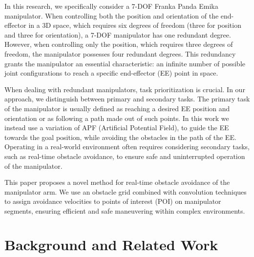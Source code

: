 \documentclass[a4paper]{article}
\begin{document}
In this research, we specifically consider a 7-DOF Franka Panda Emika~\cite{Franka2021} manipulator. When controlling both the position and orientation of the end-effector in a 3D space, which requires six degrees of freedom (three for position and three for orientation), a 7-DOF manipulator has one redundant degree. However, when controlling only the position, which requires three degrees of freedom, the manipulator possesses four redundant degrees. This redundancy grants the manipulator an essential characteristic: an infinite number of possible joint configurations to reach a specific end-effector (EE) point in space.

When dealing with redundant manipulators, task prioritization is crucial. In our approach, we distinguish between primary and secondary tasks. The primary task of the manipulator is usually defined as reaching a desired EE position and orientation or as following a path made out of such points. In this work we instead use a variation of APF (Artificial Potential Field), to guide the EE towards the goal position, while avoiding the obstacles in the path of the EE. Operating in a real-world environment often requires considering secondary tasks, such as real-time obstacle avoidance, to ensure safe and uninterrupted operation of the manipulator.

This paper proposes a novel method for real-time obstacle avoidance of the manipulator arm. We use an obstacle grid combined with convolution techniques to assign avoidance velocities to points of interest (POI) on manipulator segments, ensuring efficient and safe maneuvering within complex environments. 

\section{Background and Related Work}
\end{document}
